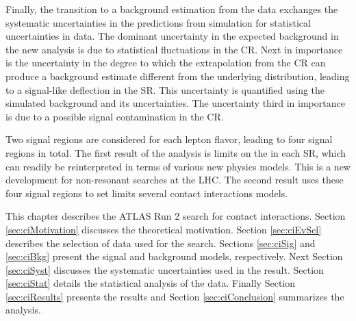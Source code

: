 Finally, the transition to a background estimation from the data exchanges the systematic uncertainties in the predictions from simulation for statistical uncertainties in data.
The dominant uncertainty in the expected background in the new analysis is due to statistical fluctuations in the CR.
Next in importance is the uncertainty in the degree to which the extrapolation from the CR can produce a background estimate different from the underlying distribution, leading to a signal-like deflection in the SR. This uncertainty is quantified using the simulated background and its uncertainties.
The uncertainty third in importance is due to a possible signal contamination in the CR.

Two signal regions are considered for each lepton flavor, leading to four signal regions in total.
The first result of the analysis is limits on the \xsbr in each SR, which can readily be reinterpreted in terms of various new physics models.
This is a new development for non-resonant searches at the LHC.
The second result uses these four signal regions to set limits several contact interactions models.

This chapter describes the ATLAS Run 2 search for contact interactions.
Section \ref{sec:ciMotivation} discusses the theoretical motivation.
Section \ref{sec:ciEvSel} describes the selection of data used for the search.
Sections \ref{sec:ciSig} and \ref{sec:ciBkg} present the signal and background models, respectively.
Next Section \ref{sec:ciSyst} discusses the systematic uncertainties used in the result.
Section \ref{sec:ciStat} details the statistical analysis of the data.
Finally Section \ref{sec:ciResults} presents the results and Section \ref{sec:ciConclusion} summarizes the analysis.











